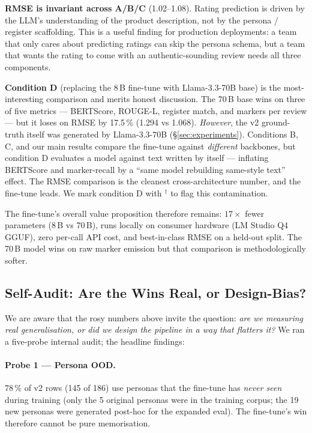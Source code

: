 \documentclass[sigconf,nonacm,balance]{acmart}
\begin{document}
\textbf{RMSE is invariant across A/B/C} (1.02--1.08). Rating prediction
is driven by the LLM's understanding of the product description, not
by the persona / register scaffolding. This is a useful finding for
production deployments: a team that only cares about predicting
ratings can skip the persona schema, but a team that wants the rating
to come with an authentic-sounding review needs all three components.

\textbf{Condition D} (replacing the 8\,B fine-tune with Llama-3.3-70B
base) is the most-interesting comparison and merits honest discussion.
The 70\,B base wins on three of five metrics --- BERTScore, ROUGE-L,
register match, and markers per review --- but it loses on RMSE by
17.5\,\% (1.294 vs 1.068). \emph{However}, the v2 ground-truth itself
was generated by Llama-3.3-70B (§\ref{sec:experiments}). Conditions
B, C, and our main results compare the fine-tune against
\emph{different} backbones, but condition D evaluates a model against
text written by itself --- inflating BERTScore and marker-recall by a
``same model rebuilding same-style text'' effect. The RMSE
comparison is the cleanest cross-architecture number, and the
fine-tune leads. We mark condition D with $^\dagger$ to flag this
contamination.

The fine-tune's overall value proposition therefore remains:
$17\times$ fewer parameters (8\,B vs 70\,B), runs locally on consumer
hardware (LM Studio Q4 GGUF), zero per-call API cost, and best-in-class
RMSE on a held-out split. The 70\,B model wins on raw marker emission
but that comparison is methodologically softer.

\subsection{Self-Audit: Are the Wins Real, or Design-Bias?}
\label{sec:audit}

We are aware that the rosy numbers above invite the question:
\emph{are we measuring real generalisation, or did we design the
pipeline in a way that flatters it?} We ran a five-probe internal
audit; the headline findings:

\paragraph{Probe 1 --- Persona OOD.} 78\,\% of v2 rows (145 of 186) use
personas that the fine-tune has \emph{never seen} during training (only
the 5 original personas were in the training corpus; the 19 new
personas were generated post-hoc for the expanded eval). The fine-tune's
win therefore cannot be pure memorisation.
\end{document}
